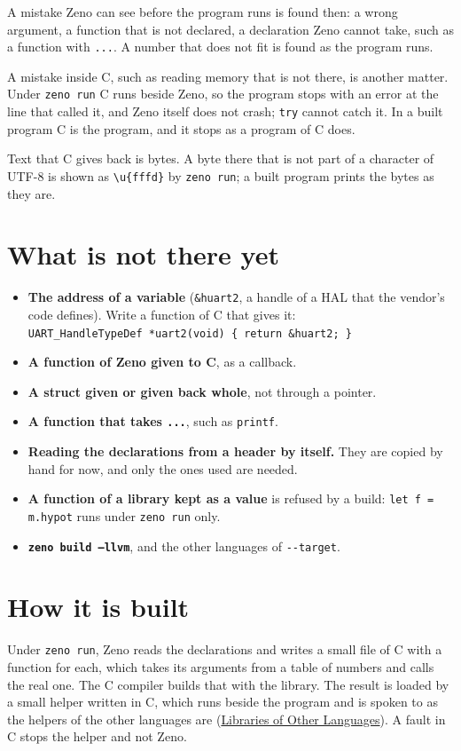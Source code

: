 A mistake Zeno can see before the program runs is found then: a wrong
argument, a function that is not declared, a declaration Zeno cannot
take, such as a function with \verb|...|. A number that does not fit
is found as the program runs.

A mistake inside C, such as reading memory that is not there, is
another matter. Under \verb|zeno run| C runs beside Zeno, so the
program stops with an error at the line that called it, and Zeno
itself does not crash; \verb|try| cannot catch it. In a built program
C is the program, and it stops as a program of C does.

Text that C gives back is bytes. A byte there that is not part of a
character of UTF-8 is shown as \verb|\u{fffd}| by \verb|zeno run|; a
built program prints the bytes as they are.

\section{What is not there yet}

\begin{itemize}
\item \textbf{The address of a variable} (\verb|&huart2|, a handle of
  a HAL that the vendor's code defines). Write a function of C that
  gives it:\\
  \verb|UART_HandleTypeDef *uart2(void) { return &huart2; }|
\item \textbf{A function of Zeno given to C}, as a callback.
\item \textbf{A struct given or given back whole}, not through a
  pointer.
\item \textbf{A function that takes \texttt{...}}, such as
  \verb|printf|.
\item \textbf{Reading the declarations from a header by itself.} They
  are copied by hand for now, and only the ones used are needed.
\item \textbf{A function of a library kept as a value} is refused by a
  build: \verb|let f = m.hypot| runs under \verb|zeno run| only.
\item \textbf{\texttt{zeno build --llvm}}, and the other languages of
  \verb|--target|.
\end{itemize}

\section{How it is built}

Under \verb|zeno run|, Zeno reads the declarations and writes a small
file of C with a function for each, which takes its arguments from a
table of numbers and calls the real one. The C compiler builds that
with the library. The result is loaded by a small helper written in
C, which runs beside the program and is spoken to as the helpers of
the other languages are (\hyperref[ch-other-languages]{Libraries of
Other Languages}). A fault in C stops the helper and not Zeno.

